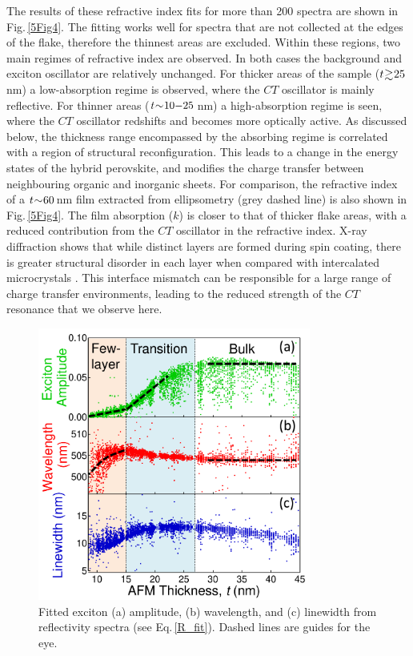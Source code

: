 The results of these refractive index fits for more than 200 spectra are shown in Fig.\,\ref{5Fig4}. The fitting works well for spectra that are not collected at the edges of the flake, therefore the thinnest areas are excluded. Within these regions, two main regimes of refractive index are observed. In both cases the background and exciton oscillator are relatively unchanged. For thicker areas of the sample ($t\negmedspace\gtrsim\negmedspace25$\,nm) a low-absorption regime is observed, where the $CT$ oscillator is mainly reflective. For thinner areas ($t\negmedspace\sim\negmedspace10\negmedspace-\negmedspace25$\,nm) a high-absorption regime is seen, where the $CT$ oscillator redshifts and becomes more optically active. As discussed below, the thickness range encompassed by the absorbing regime is correlated with a region of structural reconfiguration. This leads to a change in the energy states of the hybrid perovskite, and modifies the charge transfer between neighbouring organic and inorganic sheets. For comparison, the refractive index of a $t\negmedspace\sim\negmedspace60$\,nm film extracted from ellipsometry (grey dashed line) is also shown in Fig.\,\ref{5Fig4}. The film absorption ($k$) is closer to that of thicker flake areas, with a reduced contribution from the $CT$ oscillator in the refractive index. X-ray diffraction shows that while distinct layers are formed during spin coating, there is greater structural disorder in each layer when compared with intercalated  microcrystals \cite{Saikumar2012}. This interface mismatch can be responsible for a large range of charge transfer environments, leading to the reduced strength of the $CT$ resonance that we observe here.

\begin{figure}[h!]
\centering
\includegraphics[width=0.8\textwidth]{Fig5}
\caption{Fitted exciton (a) amplitude, (b) wavelength, and (c) linewidth from reflectivity spectra (see Eq.\,\ref{R_fit}). Dashed lines are guides for the eye.}
\label{5Fig5}
\end{figure}

